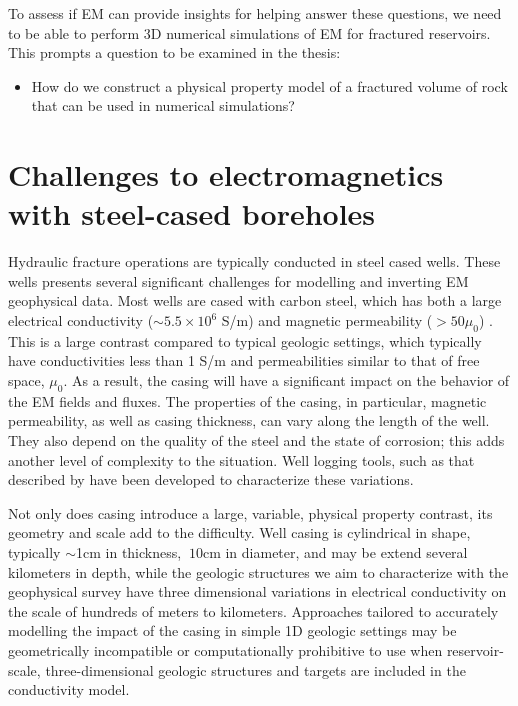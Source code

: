 To assess if EM can provide insights for helping answer these questions, we need to be able to perform 3D numerical simulations of EM for fractured reservoirs. This prompts a question to be examined in the thesis:
\begin{itemize}
\item{How do we construct a physical property model of a fractured volume of rock that can be used in numerical simulations?}
\end{itemize}

\section{Challenges to electromagnetics with steel-cased boreholes}
\label{sec:challenges-steel-casing}

Hydraulic fracture operations are typically conducted in steel cased wells. These wells presents several significant challenges for modelling and inverting EM geophysical data. Most wells are cased with carbon steel, which has both a large electrical conductivity ($\sim 5.5\times 10^6$ S/m) and magnetic permeability ($> 50 \mu_0$) \citep{wuhabashy1994}. This is a large contrast compared to  typical geologic settings, which typically have conductivities less than 1 S/m and permeabilities similar to that of free space, $\mu_0$. As a result, the casing will have a significant impact on the behavior of the EM fields and fluxes. The properties of the casing, in particular, magnetic permeability, as well as casing thickness, can vary along the length of the well. They also  depend on the quality of the steel and the state of corrosion; this adds another level of complexity to the situation. Well logging tools, such as that described by \cite{brill2012} have been developed to characterize these variations.

Not only does casing introduce a large, variable, physical property contrast, its geometry and scale add to the difficulty. Well casing is cylindrical in shape, typically $\sim$1cm in thickness, $~10$cm in diameter, and may be extend several kilometers in depth, while the geologic structures we aim to characterize with the geophysical survey have three dimensional variations in electrical conductivity on the scale of hundreds of meters to kilometers. Approaches tailored to accurately modelling the impact of the casing in simple 1D geologic settings may be geometrically incompatible or computationally prohibitive to use when reservoir-scale, three-dimensional geologic structures and targets are included in the conductivity model.

